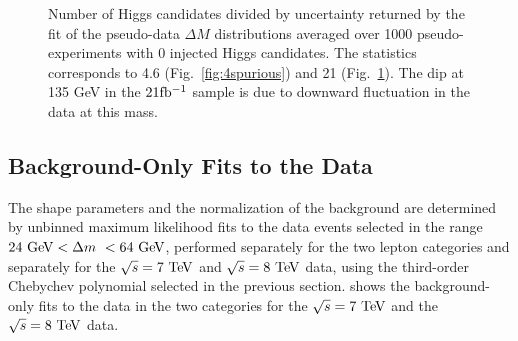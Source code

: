 \begin{figure}[htbp]
\begin{subfigure}[b]{0.45\textwidth}
      \caption{}
      \label{fig:21spurious}
    \end{subfigure}
    \caption{Number of Higgs candidates divided by uncertainty 
    returned by the fit of the pseudo-data $\Delta M$ distributions averaged over 
    1000 pseudo-experiments with 0 injected Higgs candidates. 
    The statistics corresponds to 4.6 \ifb (Fig.~\ref{fig:4spurious})
    and 21 \ifb (Fig.~\ref{fig:21spurious}). The dip at 135 GeV in the
    $21 \mbox{fb$^{-1}$}$ sample is due to downward fluctuation in the data at this mass.}
    \label{fig:spurioussignal}
\end{figure}

\subsection{Background-Only Fits to the Data}
The shape parameters and the normalization of the background are determined
by unbinned maximum likelihood fits to the data events selected in the
range $24 \GeV < \dm < 64 \GeV$, performed separately for the two lepton categories
and separately for the $\rts = 7 \TeV$ and $\rts = 8 \TeV$ data, using the third-order
Chebychev polynomial selected in the previous section. 
 shows the background-only fits to the data in the
two categories for the $\rts = 7 \TeV$ and the $\rts = 8 \TeV$ data.


